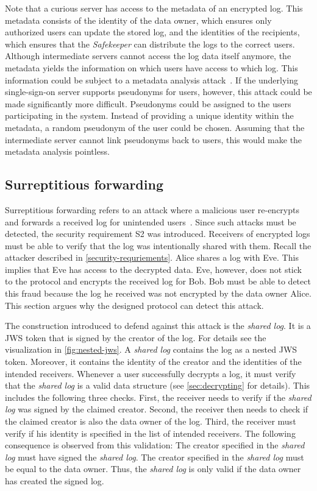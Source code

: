 \documentclass[../main.tex]{subfiles}
\begin{document}
Note that a curious server has access to the metadata of an encrypted log.
This metadata consists of the identity of the data owner, which ensures only authorized users can update the stored log, and the identities of the recipients, which ensures that the \emph{Safekeeper} can distribute the logs to the correct users.
Although intermediate servers cannot access the log data itself anymore, the metadata yields the information on which users have access to which log.
This information could be subject to a metadata analysis attack~\cite{Greschbach2012,Mayer2016}.
If the underlying single-sign-on server supports pseudonyms for users, however, this attack could be made significantly more difficult.
Pseudonyms could be assigned to the users participating in the system.
Instead of providing a unique identity within the metadata, a random pseudonym of the user could be chosen.
Assuming that the intermediate server cannot link pseudonyms back to users, this would make the metadata analysis pointless.

\subsection{Surreptitious forwarding}
Surreptitious forwarding refers to an attack where a malicious user re-encrypts and forwards a received log for unintended users~\cite{Davis2001}.
Since such attacks must be detected, the security requirement S2 was introduced.
Receivers of encrypted logs must be able to verify that the log was intentionally shared with them.
Recall the attacker described in \cref{security-requriements}.
Alice shares a log with Eve.
This implies that Eve has access to the decrypted data.
Eve, however, does not stick to the protocol and encrypts the received log for Bob.
Bob must be able to detect this fraud because the log he received was not encrypted by the data owner Alice.
This section argues why the designed protocol can detect this attack.

The construction introduced to defend against this attack is the \emph{shared log}.
It is a JWS token that is signed by the creator of the log.
For details see the visualization in \cref{fig:nested-jws}.
A \emph{shared log} contains the log as a nested JWS token.
Moreover, it contains the identity of the creator and the identities of the intended receivers.
Whenever a user successfully decrypts a log, it must verify that the \emph{shared log} is a valid data structure (see \cref{sec:decrypting} for details).
This includes the following three checks.
First, the receiver needs to verify if the \emph{shared log} was signed by the claimed creator.
Second, the receiver then needs to check if the claimed creator is also the data owner of the log. 
Third, the receiver must verify if his identity is specified in the list of intended receivers.
The following consequence is observed from this validation:
The creator specified in the \emph{shared log} must have signed the \emph{shared log}.
The creator specified in the \emph{shared log} must be equal to the data owner.
Thus, the \emph{shared log} is only valid if the data owner has created the signed log.
\end{document}
